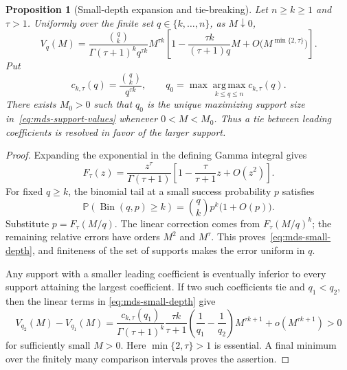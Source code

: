 \documentclass[11pt]{article}
\newtheorem{proposition}{Proposition}
\theoremstyle{definition}
\theoremstyle{remark}
\DeclareMathOperator{\Bin}{Bin}
\newcommand{\Pbb}{\mathbb P}
\newcommand{\1}{\mathbf 1}
\begin{document}
\begin{proposition}[Small-depth expansion and tie-breaking]
\label{prop:mds-small-depth}
Let \(n\ge k\ge1\) and \(\tau>1\).  Uniformly over the finite set
\(q\in\{k,\ldots,n\}\), as \(M\downarrow0\),
\begin{equation}\label{eq:mds-small-depth}
  V_q(M)
  =\frac{\binom qk}{\Gamma(\tau+1)^kq^{\tau k}}M^{\tau k}
   \left[
     1-\frac{\tau k}{(\tau+1)q}M
     +O\bigl(M^{\min\{2,\tau\}}\bigr)
   \right].
\end{equation}
Put
\begin{equation}\label{eq:mds-leading-coefficient}
  c_{k,\tau}(q)=\frac{\binom qk}{q^{\tau k}},
  \qquad
  q_0=\max\operatorname*{arg\,max}_{k\le q\le n}c_{k,\tau}(q).
\end{equation}
There exists \(M_0>0\) such that \(q_0\) is the unique maximizing
support size in~\eqref{eq:mds-support-values} whenever \(0<M<M_0\).
Thus a tie between leading coefficients is resolved in favor of the
larger support.
\end{proposition}

\begin{proof}
Expanding the exponential in the defining Gamma integral gives
\[
  F_\tau(z)
  =\frac{z^\tau}{\Gamma(\tau+1)}
    \left[1-\frac{\tau}{\tau+1}z+O(z^2)\right].
\]
For fixed \(q\ge k\), the binomial tail at a small success probability
\(p\) satisfies
\[
  \Pbb(\Bin(q,p)\ge k)=\binom qk p^k\bigl(1+O(p)\bigr).
\]
Substitute \(p=F_\tau(M/q)\).  The linear correction comes from
\(F_\tau(M/q)^k\); the remaining relative errors have orders
\(M^2\) and \(M^\tau\).  This proves~\eqref{eq:mds-small-depth},
and finiteness of the set of supports makes the error uniform in \(q\).

Any support with a smaller leading coefficient is eventually inferior
to every support attaining the largest coefficient.  If two such
coefficients tie and \(q_1<q_2\), then the linear terms in
\eqref{eq:mds-small-depth} give
\[
  V_{q_2}(M)-V_{q_1}(M)
  =\frac{c_{k,\tau}(q_1)}{\Gamma(\tau+1)^k}
    \frac{\tau k}{\tau+1}
    \left(\frac1{q_1}-\frac1{q_2}\right)M^{\tau k+1}
    +o(M^{\tau k+1})>0
\]
for sufficiently small \(M>0\).  Here
\(\min\{2,\tau\}>1\) is essential.  A final minimum over the
finitely many comparison intervals proves the assertion.
\end{proof}
\end{document}
